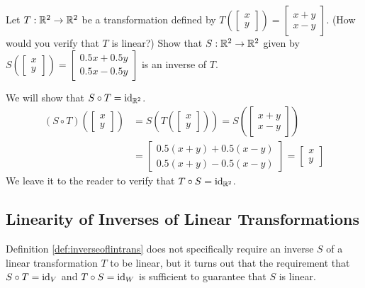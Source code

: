 \documentclass{ximera}
\begin{document}
\begin{example}\label{ex:inverseverify} Let $T:\mathbb{R}^2\rightarrow \mathbb{R}^2$ be a transformation defined by $T\left(\begin{bmatrix}x\\y\end{bmatrix}\right)=\begin{bmatrix}x+y\\x-y\end{bmatrix}$. (How would you verify that $T$ is linear?)  Show that $S:\mathbb{R}^2\rightarrow \mathbb{R}^2$ given by $S\left(\begin{bmatrix}x\\y\end{bmatrix}\right)=\begin{bmatrix}0.5x+0.5y\\0.5x-0.5y\end{bmatrix}$ is an inverse of $T$.
\begin{explanation}
We will show that $S\circ T=\text{id}_{\mathbb{R}^2}$. 
\begin{align*}
(S\circ T)\left(\begin{bmatrix}x\\y\end{bmatrix}\right)&=S\left(T\left(\begin{bmatrix}x\\y\end{bmatrix}\right)\right)=S\left(\begin{bmatrix}x+y\\x-y\end{bmatrix}\right)\\
&=\begin{bmatrix}0.5(x+y)+0.5(x-y)\\0.5(x+y)-0.5(x-y)\end{bmatrix}
=\begin{bmatrix}x\\y\end{bmatrix}
\end{align*}
We leave it to the reader to verify that $T\circ S=\text{id}_{\mathbb{R}^2}$.
 
\end{explanation}
\end{example}

 
\subsection*{Linearity of Inverses of Linear Transformations}
 
Definition \ref{def:inverseoflintrans} does not specifically require an inverse $S$ of a linear transformation $T$ to be linear, but it turns out that the requirement that $S\circ T=\text{id}_V$ and $T\circ S=\text{id}_W$ is sufficient to guarantee that $S$ is linear. 
 
\end{document}
